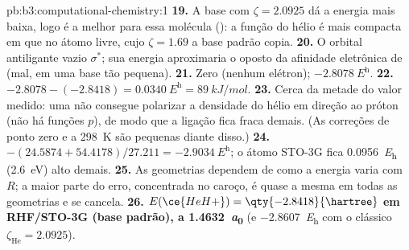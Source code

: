 \begin{solution}{pb:b3:computational-chemistry:1}
\textbf{19.} A base com $\zeta = 2.0925$ dá a energia mais baixa, logo é a
melhor para essa molécula (): a função do hélio é mais
compacta em  que no átomo livre, cujo $\zeta = 1.69$ a base padrão
copia.
\textbf{20.} O orbital antiligante vazio $\sigma^*$; sua energia aproximaria o
oposto da afinidade eletrônica de  (mal, em uma base tão pequena).
\textbf{21.} Zero (nenhum elétron); $\qty{-2.8078}{\hartree}$.
\textbf{22.} $-2.8078 - (-2.8418) = \qty{0.0340}{\hartree} = \qty{89}{kJ/mol}$.
\textbf{23.} Cerca da metade do valor medido: uma  não consegue
polarizar a densidade do hélio em direção ao próton (não há funções $p$), de
modo que a ligação fica fraca demais. (As correções de ponto zero e a \qty{298}{K}
são pequenas diante disso.)
\textbf{24.} $-(24.5874 + 54.4178)/27.211 = \qty{-2.9034}{\hartree}$; o átomo STO-3G
fica \qty{0.0956}{\hartree} (\qty{2.6}{eV}) alto demais.
\textbf{25.} As geometrias dependem de como a energia varia com $R$; a maior
parte do erro, concentrada no caroço, é quase a mesma em todas as geometrias e
se cancela.
\textbf{26.} \textbf{$E(\ce{HeH+}) = \qty{-2.8418}{\hartree}$ em RHF/STO-3G (base
padrão), a \qty{1.4632}{\bohr}} (e \qty{-2.8607}{\hartree} com o clássico
$\zeta_{\mathrm{He}} = 2.0925$).
\end{solution}
